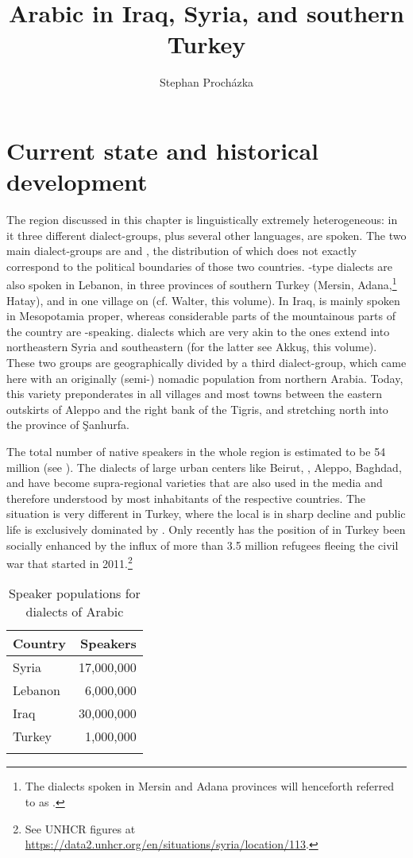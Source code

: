 \documentclass[output=paper]{langsci/langscibook}
\author{Stephan Procházka\affiliation{University of Vienna}}
\title{Arabic in Iraq, Syria, and southern Turkey}
\begin{document}
\section{Current state and historical development}  \label{state} 

The region discussed in this chapter is linguistically extremely heterogeneous: in it three different  dialect-groups, plus several other languages, are spoken. The two main  dialect-groups are  and , the distribution of which does not exactly correspond to the political boundaries of those two countries. -type dialects are also spoken in Lebanon, in three provinces of southern Turkey (Mersin, Adana,\footnote{The dialects spoken in Mersin and Adana provinces will henceforth referred to as  .} Hatay), and in one village on  (cf. Walter, this volume). In Iraq,  is mainly spoken in Mesopotamia proper, whereas considerable parts of the mountainous parts of the country are -speaking.  dialects which are very akin to the  ones extend into northeastern Syria and southeastern  (for the latter see Akkuş, this volume). These two groups are geographically divided by a third dialect-group, which came here with an originally (semi-) nomadic population from northern Arabia. Today, this variety preponderates in all villages and most towns between the eastern outskirts of Aleppo and the right bank of the Tigris, and stretching north into the  province of Şanlıurfa. 

The total number of native  speakers in the whole region is estimated to be 54 million (see ). The dialects of large urban centers like Beirut, , Aleppo, Baghdad, and  have become supra-regional  varieties that are also used in the media and therefore understood by most inhabitants of the respective countries. The situation is very different in Turkey, where the local  is in sharp decline and public life is exclusively dominated by . Only recently has the position of  in Turkey been socially enhanced by the influx of more than 3.5 million  refugees fleeing the civil war that started in 2011.\footnote{See UNHCR figures at \url{https://data2.unhcr.org/en/situations/syria/location/113}.}

\begin{table}
\begin{tabularx}{.50\textwidth}{Xr}
\lsptoprule
Country & Speakers\\
\midrule
{Syria} &  17,000,000\\
{Lebanon} & 6,000,000\\
{Iraq} &  30,000,000\\
Turkey &  1,000,000\\
\lspbottomrule
\end{tabularx} 
\caption{Speaker populations for dialects of Arabic}
\label{tab:prochazka:1}
\end{table}
\end{document}
